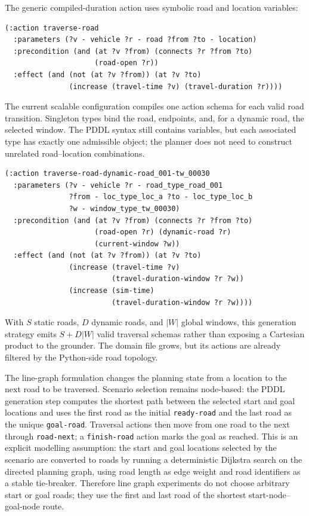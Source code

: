\documentclass[10pt]{article}
\begin{document}
The generic compiled-duration action uses symbolic road and location variables:
\begin{lstlisting}
(:action traverse-road
  :parameters (?v - vehicle ?r - road ?from ?to - location)
  :precondition (and (at ?v ?from) (connects ?r ?from ?to)
                     (road-open ?r))
  :effect (and (not (at ?v ?from)) (at ?v ?to)
               (increase (travel-time ?v) (travel-duration ?r))))
\end{lstlisting}

The current scalable configuration compiles one action schema for each valid
road transition. Singleton types bind the road, endpoints, and, for a dynamic
road, the selected window. The PDDL syntax still contains variables, but each
associated type has exactly one admissible object; the planner does not need to
construct unrelated road--location combinations.
\begin{lstlisting}
(:action traverse-road-dynamic-road_001-tw_00030
  :parameters (?v - vehicle ?r - road_type_road_001
               ?from - loc_type_loc_a ?to - loc_type_loc_b
               ?w - window_type_tw_00030)
  :precondition (and (at ?v ?from) (connects ?r ?from ?to)
                     (road-open ?r) (dynamic-road ?r)
                     (current-window ?w))
  :effect (and (not (at ?v ?from)) (at ?v ?to)
               (increase (travel-time ?v)
                         (travel-duration-window ?r ?w))
               (increase (sim-time)
                         (travel-duration-window ?r ?w))))
\end{lstlisting}

With $S$ static roads, $D$ dynamic roads, and $|W|$ global windows, this
generation strategy emits $S+D|W|$ valid traversal schemas rather than exposing
a Cartesian product to the grounder. The domain file grows, but its actions are
already filtered by the Python-side road topology.

The line-graph formulation changes the planning state from a location to the
next road to be traversed. Scenario selection remains node-based: the PDDL
generation step computes the shortest path between the selected start and goal
locations and uses the first road as the initial \texttt{ready-road} and the
last road as the unique \texttt{goal-road}. Traversal actions then move from one
road to the next through \texttt{road-next}; a \texttt{finish-road} action marks
the goal as reached. This is an explicit modelling assumption: the start and
goal locations selected by the scenario are converted to roads by running a
deterministic Dijkstra search on the directed planning graph, using road length
as edge weight and road identifiers as a stable tie-breaker. Therefore line
graph experiments do not choose arbitrary start or goal roads; they use the
first and last road of the shortest start-node--goal-node route.
\end{document}
